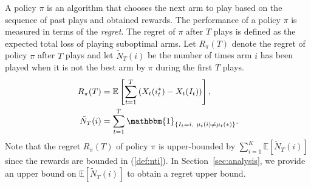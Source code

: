 \documentclass[letterpaper]{article} %
\begin{document}
A policy $\pi$ is an algorithm that chooses the next arm to play based on the sequence of past plays and obtained rewards. The performance of a policy $\pi$ is measured in terms of the \emph{regret}. The regret of $\pi$ after $T$ plays is defined as the expected total loss of playing suboptimal arms. Let $R_\pi(T)$ denote the regret of policy $\pi$ after $T$ plays and let $\tilde{N}_T(i)$ be the number of times arm $i$ has been played when it is not the best arm by $\pi$ during the first $T$ plays.
\begin{align}\label{def:nti}
R_\pi(T)&=\mathbb{E}\left[\sum_{t=1}^T\left(X_t(i^*_t)-X_t(I_t)\right)\right],\\
\tilde{N}_T(i)&=\sum_{t=1}^T\mathbbm{1}_{\left\{I_t=i,~\mu_t(i)\neq \mu_t(*)\right\}}.
\end{align}
Note that the regret $R_\pi(T)$ of policy $\pi$ is upper-bounded by $\sum_{i=1}^K\mathbb{E}[\tilde{N}_T(i)]$ since the rewards are bounded in (\ref{def:nti}). 
In Section~\ref{sec:analysis}, we provide an upper bound on $\mathbb{E}[\tilde{N}_T(i)]$ to obtain a regret upper bound.

\end{document}

